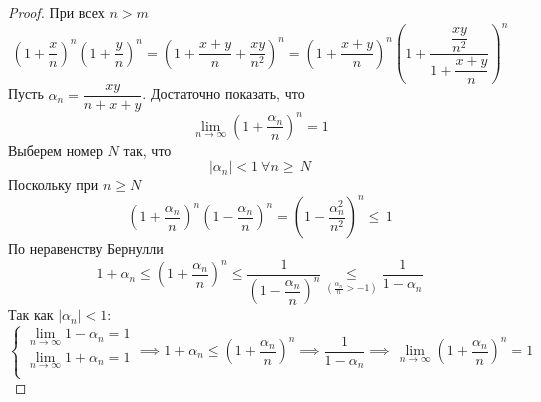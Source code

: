 \begin{proposition}
\end{proposition} \begin{proof}
    При всех $ n > m$ \begin{equation}
        \left(1 + \dfrac{x}{n}\right)^n\left(1 + \dfrac{y}{n}\right)^n = \left( 1 + \dfrac{x + y}{n} + \dfrac{xy}{n^2}  \right)^n = \left(1 + \dfrac{x + y}{n} \right)^n\left(1 + \dfrac{\dfrac{xy}{n^2} }{1 + \dfrac{x + y}{n} }\right)^ n
    \end{equation}
    Пусть $ \alpha_n = \dfrac{xy}{n + x + y}  $. Достаточно показать, что \begin{equation}
        \lim_{n \to \infty}\left(1 + \frac{\alpha_n}{n} \right)^n = 1
    \end{equation}
    Выберем номер $ N $ так, что \begin{equation}
        |\alpha_n| < 1 \:\forall n \geq\, N
    \end{equation}
    Поскольку при $ n \geq N $ \begin{equation}
        \left(1 + \frac{\alpha_n}{n} \right)^n\left(1 - \frac{\alpha_n}{n} \right)^n = \left(1 - \dfrac{\alpha_n^2}{n^2} \right)^n \leq\, 1
    \end{equation}
    По неравенству Бернулли \begin{equation}
        1 + \alpha_n  \leq \left(1 + \dfrac{\alpha_n}{n} \right)^n \leq \dfrac{1}{\left(1 - \dfrac{\alpha_n}{n}\right)^n} \underset{\left(\frac{\alpha_n}{n} > - 1\right)}{ \leq }\dfrac{1}{1 - \alpha_n}
    \end{equation}
    Так как $ |\alpha_n| < 1 $:
    \begin{equation}
    \begin{cases}
        \lim_{n \to \infty}1 - \alpha_n = 1 \\
        \lim_{n \to \infty}1 + \alpha_n = 1 \\
    \end{cases} \implies 1 + \alpha_n \leq \left(1 + \dfrac{\alpha_n}{n}\right)^n \implies \dfrac{1}{1 - \alpha_n} \implies\,\lim_{n \to \infty}\left(1 + \dfrac{\alpha_n}{n}\right)^n = 1 
   \end{equation}
\end{proof}

